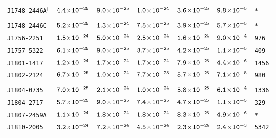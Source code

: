 \begin{longtable}{l | c | c | c | c | c | l}
\scriptsize{\tt{J1748-2446A}$^{\ddagger}$} & \scriptsize{$\tt{4.4\!\times\!10^{-25}}$} &
\scriptsize{$\tt{9.0\!\times\!10^{-25}}$} & \scriptsize{$\tt{1.0\!\times\!10^{-24}}$} & \scriptsize{$\tt{3.6\!\times\!10^{-25}}$}
& \scriptsize{$\tt{9.8\!\times\!10^{-5}}$} & \scriptsize{\tt{*}} \\[-16pt] 
\\[-20pt] 
\scriptsize{\tt{J1748-2446C}} & \scriptsize{$\tt{5.2\!\times\!10^{-25}}$} & \scriptsize{$\tt{1.3\!\times\!10^{-24}}$} & \scriptsize{$\tt{7.5\!\times\!10^{-25}}$} & \scriptsize{$\tt{3.9\!\times\!10^{-25}}$} & \scriptsize{$\tt{5.7\!\times\!10^{-5}}$} & \scriptsize{\tt{*}} \\[-16pt] 
\scriptsize{\tt{J1756-2251}} & \scriptsize{$\tt{1.5\!\times\!10^{-24}}$} & \scriptsize{$\tt{5.0\!\times\!10^{-24}}$} & \scriptsize{$\tt{2.5\!\times\!10^{-24}}$} &\scriptsize{$\tt{1.6\!\times\!10^{-24}}$} & \scriptsize{$\tt{9.0\!\times\!10^{-4}}$} & \scriptsize{\tt{976}} \\[-16pt] 
\scriptsize{\tt{J1757-5322}} & \scriptsize{$\tt{6.1\!\times\!10^{-25}}$} & \scriptsize{$\tt{9.0\!\times\!10^{-25}}$} & \scriptsize{$\tt{8.7\!\times\!10^{-25}}$} &\scriptsize{$\tt{4.2\!\times\!10^{-25}}$} & \scriptsize{$\tt{1.1\!\times\!10^{-5}}$} & \scriptsize{\tt{409}} \\[-16pt] 
\scriptsize{\tt{J1801-1417}} & \scriptsize{$\tt{1.2\!\times\!10^{-24}}$} & \scriptsize{$\tt{1.7\!\times\!10^{-24}}$} & \scriptsize{$\tt{1.7\!\times\!10^{-24}}$} &\scriptsize{$\tt{7.9\!\times\!10^{-25}}$} & \scriptsize{$\tt{4.4\!\times\!10^{-6}}$} & \scriptsize{\tt{1456}} \\[-16pt] 
\scriptsize{\tt{J1802-2124}} & \scriptsize{$\tt{6.7\!\times\!10^{-25}}$} & \scriptsize{$\tt{1.0\!\times\!10^{-24}}$} & \scriptsize{$\tt{7.7\!\times\!10^{-25}}$} &\scriptsize{$\tt{5.7\!\times\!10^{-25}}$} & \scriptsize{$\tt{7.1\!\times\!10^{-5}}$} & \scriptsize{\tt{980}} \\[-16pt] 
\\[-20pt] 
\scriptsize{\tt{J1804-0735}} & \scriptsize{$\tt{7.0\!\times\!10^{-25}}$} & \scriptsize{$\tt{2.1\!\times\!10^{-24}}$} & \scriptsize{$\tt{1.0\!\times\!10^{-24}}$} &\scriptsize{$\tt{5.8\!\times\!10^{-25}}$} & \scriptsize{$\tt{6.1\!\times\!10^{-4}}$} & \scriptsize{\tt{1336}} \\[-16pt] 
\scriptsize{\tt{J1804-2717}} & \scriptsize{$\tt{5.7\!\times\!10^{-25}}$} & \scriptsize{$\tt{9.0\!\times\!10^{-25}}$} & \scriptsize{$\tt{7.4\!\times\!10^{-25}}$} &\scriptsize{$\tt{4.7\!\times\!10^{-25}}$} & \scriptsize{$\tt{1.1\!\times\!10^{-5}}$} & \scriptsize{\tt{329}} \\[-16pt] 
\scriptsize{\tt{J1807-2459A}} & \scriptsize{$\tt{1.1\!\times\!10^{-24}}$} & \scriptsize{$\tt{1.8\!\times\!10^{-24}}$} & \scriptsize{$\tt{1.8\!\times\!10^{-24}}$} & \scriptsize{$\tt{8.3\!\times\!10^{-25}}$} & \scriptsize{$\tt{4.9\!\times\!10^{-6}}$} & \scriptsize{\tt{*}} \\[-16pt] 
\scriptsize{\tt{J1810-2005}} & \scriptsize{$\tt{3.2\!\times\!10^{-24}}$} & \scriptsize{$\tt{7.2\!\times\!10^{-24}}$} & \scriptsize{$\tt{4.5\!\times\!10^{-24}}$} &\scriptsize{$\tt{2.3\!\times\!10^{-24}}$} & \scriptsize{$\tt{2.4\!\times\!10^{-3}}$} & \scriptsize{\tt{5342}} \\[-16pt] 

\end{longtable}
